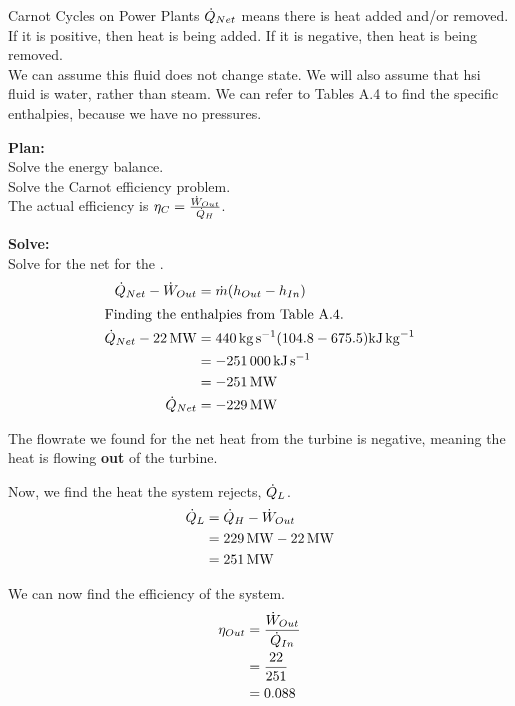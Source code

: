\begin{example}{Carnot Cycles on Power Plants}
  $\dot{Q}_{Net}$ means there is heat added and/or removed.
  If it is positive, then heat is being added.
  If it is negative, then heat is being removed. \\
  We can assume this fluid does not change state.
  We will also assume that hsi fluid is water, rather than steam.
  We can refer to Tables A.4 to find the specific enthalpies, because we have no pressures.

  \textbf{Plan:} \\
  Solve the  energy balance. \\
  Solve the Carnot efficiency problem. \\
  The actual efficiency is $\eta_{C} = \frac{\dot{W}_{Out}}{\dot{Q}_{H}}$.

  \textbf{Solve:} \\
  Solve for the net  for the .
  \begin{align*}
    \dot{Q}_{Net} - \dot{W}_{Out} &= \dot{m} (h_{Out} - h_{In}) \\
    \intertext{Finding the enthalpies from Table A.4.}
    \dot{Q}_{Net} - \SI{22}{\mega\watt} &= \SI{440}{\kilo\gram\per\second} (104.8 - 675.5) \si{\kilo\joule\per\kilo\gram} \\
                                                    &= \SI{-251000}{\kilo\joule\per\second} \\
                                                    &= \SI{-251}{\mega\watt} \\
    \dot{Q}_{Net} &= \SI{-229}{\mega\watt}
  \end{align*}

  The flowrate we found for the net heat from the turbine is negative, meaning the heat is flowing \textbf{out} of the turbine.

  Now, we find the heat the system rejects, $\dot{Q}_{L}$.
  \begin{align*}
    \dot{Q}_{L} &= \dot{Q}_{H} - \dot{W}_{Out} \\
                         &= \SI{229}{\mega\watt} - \SI{22}{\mega\watt} \\
                         &= \SI{251}{\mega\watt}
  \end{align*}

  We can now find the efficiency of the system.
  \begin{align*}
    \eta_{Out} &= \frac{\dot{W}_{Out}}{\dot{Q}_{In}} \\
                    &= \frac{22}{251} \\
    &= 0.088
  \end{align*}


\end{example}
